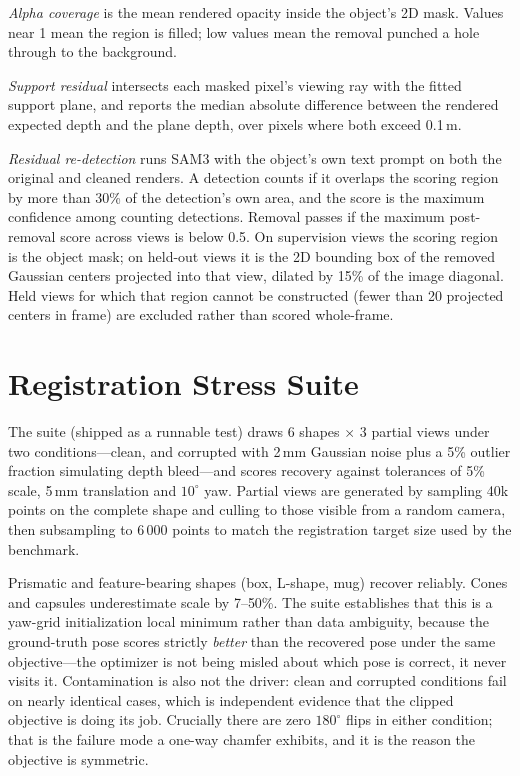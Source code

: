 \emph{Alpha coverage} is the mean rendered opacity inside the object's 2D
mask. Values near 1 mean the region is filled; low values mean the removal
punched a hole through to the background.

\emph{Support residual} intersects each masked pixel's viewing ray with
the fitted support plane, and reports the median absolute difference
between the rendered expected depth and the plane depth, over pixels where
both exceed 0.1\,m.

\emph{Residual re-detection} runs SAM3 with the object's own text prompt on
both the original and cleaned renders. A detection counts if it overlaps
the scoring region by more than 30\% of the detection's own area, and the
score is the maximum confidence among counting detections. Removal passes
if the maximum post-removal score across views is below 0.5. On
supervision views the scoring region is the object mask; on held-out views
it is the 2D bounding box of the removed Gaussian centers projected into
that view, dilated by 15\% of the image diagonal. Held views for which
that region cannot be constructed (fewer than 20 projected centers in
frame) are excluded rather than scored whole-frame.

\section{Registration Stress Suite}
\label{app:stress}
The suite (shipped as a runnable test) draws 6 shapes $\times$ 3 partial
views under two conditions---clean, and corrupted with 2\,mm Gaussian
noise plus a 5\% outlier fraction simulating depth bleed---and scores
recovery against tolerances of 5\% scale, 5\,mm translation and
$10^\circ$ yaw. Partial views are generated by sampling 40k points on the
complete shape and culling to those visible from a random camera, then
subsampling to 6\,000 points to match the registration target size used
by the benchmark.

Prismatic and feature-bearing shapes (box, L-shape, mug) recover
reliably. Cones and capsules underestimate scale by 7--50\%. The suite
establishes that this is a yaw-grid initialization local minimum rather
than data ambiguity, because the ground-truth pose scores strictly
\emph{better} than the recovered pose under the same objective---the
optimizer is not being misled about which pose is correct, it never visits
it. Contamination is also not the driver: clean and corrupted conditions
fail on nearly identical cases, which is independent evidence that the
clipped objective is doing its job. Crucially there are zero $180^\circ$
flips in either condition; that is the failure mode a one-way chamfer
exhibits, and it is the reason the objective is symmetric.


